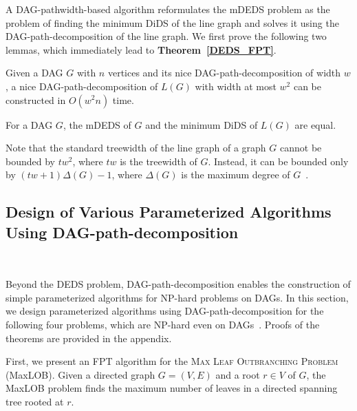 \documentclass[runningheads]{llncs}
\theoremstyle{plain}
\theoremstyle{definition}
\begin{document}
A DAG-pathwidth-based algorithm reformulates the mDEDS problem as the problem of finding the minimum DiDS of the line graph and solves it using the DAG-path-decomposition of the line graph.  
We first prove the following two lemmas, which immediately lead to \textbf{Theorem~\ref{DEDS_FPT}}.  

\begin{lemma}\label{DAG_path_decomposition(L(G))}
    Given a DAG \(G\) with \(n\) vertices and its nice DAG-path-decomposition of width \(w\), a nice DAG-path-decomposition of \(L(G)\) with width at most \(w^2\) can be constructed in \(O(w^2 n)\) time.  
\end{lemma}

\begin{lemma}\label{mDEDS_mDiDS}
    For a DAG \(G\), the mDEDS of \(G\) and the minimum DiDS of \(L(G)\) are equal.  
\end{lemma}

Note that the standard treewidth of the line graph of a graph $G$ cannot be bounded by $tw^2$, where $tw$ is the treewidth of $G$. Instead, it can be bounded only by $(tw + 1) \Delta(G) - 1$, where $\Delta(G)$ is the maximum degree of $G$~\cite{art24}.



\subsection{Design of Various Parameterized Algorithms Using DAG-path-decomposition}~\label{sec:algother}

Beyond the DEDS problem, DAG-path-decomposition enables the construction of simple parameterized algorithms for NP-hard problems on DAGs.  
In this section, we design parameterized algorithms using DAG-path-decomposition for the following four problems, which are NP-hard even on DAGs~\cite{art17}.  
Proofs of the theorems are provided in the appendix.  

First, we present an FPT algorithm for the \textsc{Max Leaf Outbranching Problem} (MaxLOB).  
Given a directed graph \(G = (V, E)\) and a root \(r \in V\) of $G$, the MaxLOB problem finds the maximum number of leaves in a directed spanning tree rooted at \(r\). 
\end{document}
